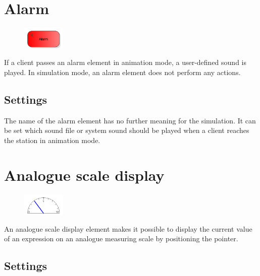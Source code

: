 \section{Alarm}
\label{ref:ModelElementAnimationAlarm}

\begin{figure}
\vspace{-22pt}
\includegraphics[width=2cm]{imageModelElementAnimationAlarm.png}
\vspace{-22pt}
\end{figure}

If a client passes an alarm element in animation mode, a user-defined sound is played.
In simulation mode, an alarm element does not perform any actions.

\subsection*{Settings}

The name of the alarm element has no further meaning for the simulation.
It can be set which sound file or system sound should be played when a client
reaches the station in animation mode.


\section{Analogue scale display}
\label{ref:ModelElementAnimationPointerMeasuring}

\begin{figure}
\vspace{-22pt}
\includegraphics[width=2cm]{imageModelElementAnimationPointerMeasuring.png}
\vspace{-22pt}
\end{figure}

An analogue scale display element makes it possible to display the current
value of an expression on an analogue measuring scale by positioning the pointer.

\subsection*{Settings}

